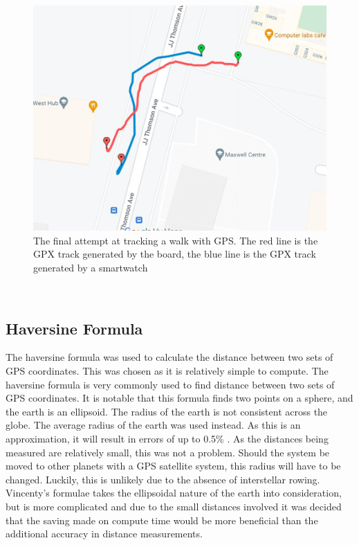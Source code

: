 \documentclass[12pt,a4paper]{report}
\begin{document}
\begin{figure} [h]
\begin{center}
\includegraphics[scale=0.4]{gps2.jpg}
\end{center}
\caption{The final attempt at tracking a walk with GPS. The red line is the GPX track generated by the board, the blue line is the GPX track generated by a smartwatch \cite{googlemapsgeneral}}
\end{figure}\\ 

\subsection{Haversine Formula}
The haversine formula was used to calculate the distance between two sets of GPS coordinates. This was chosen as it is relatively simple to compute. The haversine formula is very commonly used to find distance between two sets of GPS coordinates. It is notable that this formula finds two points on a sphere, and the earth is an ellipsoid. The radius of the earth is not consistent across the globe. The average radius of the earth was used instead. As this is an approximation, it will result in errors of up to 0.5\% \cite{gps}. As the distances being measured are relatively small, this was not a problem. Should the system be moved to other planets with a GPS satellite system, this radius will have to be changed. Luckily, this is unlikely due to the absence of interstellar rowing. \\ %
Vincenty's formulae takes the ellipsoidal nature of the earth into consideration, but is more complicated and due to the small distances involved it was decided that the saving made on compute time would be more beneficial than the additional accuracy in distance measurements. 
\end{document}
